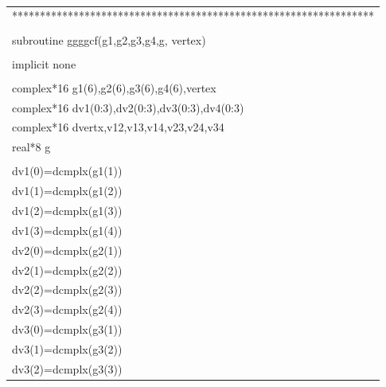 \documentclass[a4paper,11pt]{article}
\begin{document}
\begin{center}
\small
{\tt
\begin{supertabular}{l}
 *****************************************************************\\\\
     \hspace{0.5em} subroutine ggggcf(g1,g2,g3,g4,g, vertex)\\
\\
      \hspace{0.5em} implicit none\\
\\
      \hspace{0.5em} complex*16    g1(6),g2(6),g3(6),g4(6),vertex\\
      \hspace{0.5em} complex*16 dv1(0:3),dv2(0:3),dv3(0:3),dv4(0:3)\\
      \hspace{0.5em} complex*16 dvertx,v12,v13,v14,v23,v24,v34\\
      \hspace{0.5em} real*8 g\\
\\
      \hspace{0.5em} dv1(0)=dcmplx(g1(1))\\
      \hspace{0.5em} dv1(1)=dcmplx(g1(2))\\
      \hspace{0.5em} dv1(2)=dcmplx(g1(3))\\
      \hspace{0.5em} dv1(3)=dcmplx(g1(4))\\
      \hspace{0.5em} dv2(0)=dcmplx(g2(1))\\
      \hspace{0.5em} dv2(1)=dcmplx(g2(2))\\
      \hspace{0.5em} dv2(2)=dcmplx(g2(3))\\
      \hspace{0.5em} dv2(3)=dcmplx(g2(4))\\
      \hspace{0.5em} dv3(0)=dcmplx(g3(1))\\
      \hspace{0.5em} dv3(1)=dcmplx(g3(2))\\
      \hspace{0.5em} dv3(2)=dcmplx(g3(3))\\

\end{supertabular}}
\end{center}
\end{document}
